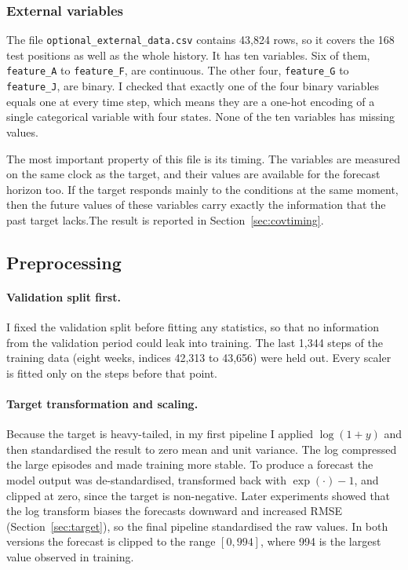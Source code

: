 \documentclass[a4, 12pt]{article}
\begin{document}
\subsubsection{External variables}

The file \texttt{optional\_external\_data.csv} contains 43,824 rows, so it covers the 168 test positions as well as the whole history. It has ten variables. Six of them, \texttt{feature\_A} to \texttt{feature\_F}, are continuous. The other four, \texttt{feature\_G} to \texttt{feature\_J}, are binary. I checked that exactly one of the four binary variables equals one at every time step, which means they are a one-hot encoding of a single categorical variable with four states. None of the ten variables has missing values.

The most important property of this file is its timing. The variables are measured on the same clock as the target, and their values are available for the forecast horizon too. If the target responds mainly to the conditions at the same moment, then the future values of these variables carry exactly the information that the past target lacks.The result is reported in Section~\ref{sec:covtiming}.


\subsection{Preprocessing}

\paragraph{Validation split first.} I fixed the validation split before fitting any statistics, so that no information from the validation period could leak into training. The last 1,344 steps of the training data (eight weeks, indices 42,313 to 43,656) were held out. Every scaler is fitted only on the steps before that point.

\paragraph{Target transformation and scaling.} Because the target is heavy-tailed, in my first pipeline I applied $\log(1+y)$ and then standardised the result to zero mean and unit variance. The log compressed the large episodes and made training more stable. To produce a forecast the model output was de-standardised, transformed back with $\exp(\cdot)-1$, and clipped at zero, since the target is non-negative. Later experiments showed that the log transform biases the forecasts downward and increased RMSE (Section~\ref{sec:target}), so the final pipeline standardised the raw values. In both versions the forecast is clipped to the range $[0, 994]$, where 994 is the largest value observed in training. 
\end{document}
